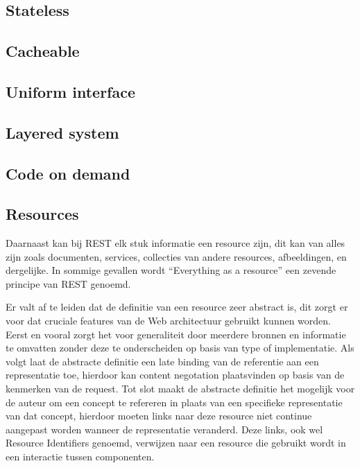 \subsection{Stateless}
\label{subsec:Stateless}

\subsection{Cacheable}
\label{subsec:Cacheable}

\subsection{Uniform interface}
\label{subsec:Uniform interface}

\subsection{Layered system}
\label{subsec:Layered system}

\subsection{Code on demand}
\label{subsec:Code on demand}

\subsection{Resources}
\label{subsec:Resources}
Daarnaast kan bij REST elk stuk informatie een resource zijn, dit kan van alles zijn zoals documenten, services, collecties van andere resources, afbeeldingen, en dergelijke. In sommige gevallen wordt “Everything as a resource”  een zevende principe van REST genoemd. 

Er valt af te leiden dat de definitie van een resource zeer abstract is, dit zorgt er voor dat cruciale features van de Web architectuur gebruikt kunnen worden. Eerst en vooral zorgt het voor generaliteit door meerdere bronnen en informatie te omvatten zonder deze te onderscheiden op basis van type of implementatie. Als volgt laat de abstracte definitie een late binding van de referentie aan een representatie toe, hierdoor kan content negotation plaatsvinden op basis van de kenmerken van de request. Tot slot maakt de abstracte definitie het mogelijk voor de auteur om een concept te refereren in plaats van een specifieke representatie van dat concept, hierdoor moeten links naar deze resource niet continue aangepast worden wanneer de representatie veranderd.
Deze links, ook wel Resource Identifiers genoemd, verwijzen naar een resource die gebruikt wordt in een interactie tussen componenten.

